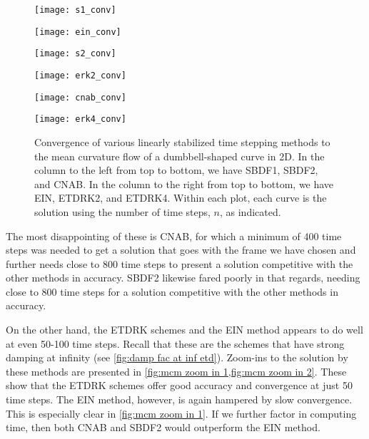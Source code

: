 \begin{figure}[htb!]
        \centering
\begin{minipage}{0.48\textwidth}
        \texttt{[image: s1\_conv]}
\end{minipage}
\begin{minipage}{0.48\textwidth}
        \texttt{[image: ein\_conv]}
\end{minipage}
\begin{minipage}{0.48\textwidth}
        \texttt{[image: s2\_conv]}
\end{minipage}
\begin{minipage}{0.48\textwidth}
        \texttt{[image: erk2\_conv]}
\end{minipage}
\begin{minipage}{0.48\textwidth}
        \texttt{[image: cnab\_conv]}
\end{minipage}
\begin{minipage}{0.48\textwidth}
        \texttt{[image: erk4\_conv]}
\end{minipage}
\caption[Convergence of linearly stabilized schemes to a shrinking dumbbell problem.]{Convergence of various linearly stabilized time stepping methods to the mean curvature flow of a dumbbell-shaped curve in 2D. In the column to the left from top to bottom, we have SBDF1, SBDF2, and CNAB. In the column to the right from top to bottom, we have EIN, ETDRK2, and ETDRK4. Within each plot, each curve is the solution using the number of time steps, $n$, as indicated.}
\label{fig:mcm 2d conv}
\end{figure}

The most disappointing of these is CNAB, for which a minimum of 400 time steps was needed to get a solution that goes with the frame we have chosen and further needs close to 800 time steps to present a solution competitive with the other methods in accuracy. SBDF2 likewise fared poorly in that regards, needing close to 800 time steps for a solution competitive with the other methods in accuracy. 

On the other hand, the ETDRK schemes and the EIN method appears to do well at even 50-100 time steps. Recall that these are the schemes that have strong damping at infinity (see \cref{fig:damp fac at inf etd}). Zoom-ins to the solution by these methods are presented in \cref{fig:mcm zoom in 1,fig:mcm zoom in 2}. These show that the ETDRK schemes offer good accuracy and convergence at just 50 time steps. The EIN method, however, is again hampered by slow convergence. This is especially clear in \cref{fig:mcm zoom in 1}. If we further factor in computing time, then both CNAB and SBDF2 would outperform the EIN method.

